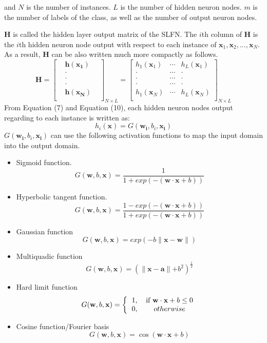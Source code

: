 \documentclass[a4paper, 14pt]{extarticle}
\begin{document}
and \(N\) is the number of instances. \(L\) is the number of hidden neuron nodes. \(m\) is the number of labels of the class, as well as the number of output neuron nodes.
\par \textbf{H} is called the hidden layer output matrix of the SLFN. The \(i\)th column of \textbf{H} is the \(i\)th hidden neuron node output with respect to each instance of \(\mathbf{x}_1, \mathbf{x}_2, ..., \mathbf{x}_N\)\cite{huang2006extreme}. As a result, \(\mathbf{H}\) can be also written much more compactly as follows. 
\begin{equation}
    \mathbf{H}
    =
    \begin{bmatrix}
    &\mathbf{h(x_1)}&\\
    &\cdot&\\
    &\cdot&\\
    &\cdot&\\
    &\mathbf{h(x_N)}&\\
    \end{bmatrix}_{N \times L}
    = 
    \begin{bmatrix}
    h_1(\mathbf{x}_1) & \cdots & h_L(\mathbf{x}_1)\\
    \cdot & \cdots & \cdot\\
    \cdot & \cdots & \cdot\\
    \cdot & \cdots & \cdot\\
    h_1(\mathbf{x}_N) & \cdots & h_L(\mathbf{x}_N)\\
    \end{bmatrix}_{N\times L}
\end{equation}
From Equation (7) and Equation (10), each hidden neuron nodes output regarding to each instance is written as:  
\begin{equation}
    h_i(\mathbf{x}) = G(\mathbf{w_i}, b_i, \mathbf{x_i})
\end{equation}
\(G(\mathbf{w_i}, b_i, \mathbf{x_i})\) can use the following activation functions to map the input domain into the output domain\cite{huang2015trends}.
\begin{itemize}
    \item Sigmoid function. \[G(\mathbf{w}, b, \mathbf{x})= \frac{1}{1+exp(-(\mathbf{w \cdot x}+b))}\]
    \item Hyperbolic tangent function. \[G(\mathbf{w}, b, \mathbf{x})= \frac{1-exp(-(\mathbf{w \cdot x}+b))}{1+exp(-(\mathbf{w \cdot x}+b))} \]
    \item Gaussian function \[G(\mathbf{w}, b, \mathbf{x})= exp(-b\parallel \mathbf{x}-\mathbf{w} \parallel)\]
    \item Multiquadic function \[G(\mathbf{w}, b, \mathbf{x})= (\parallel \mathbf{x} - \mathbf{a} \parallel+b^2)^{\frac{1}{2}}\]
    \item Hard limit function 
    \[G(\mathbf{w}, b, \mathbf{x})= 
     \bigg\{
    \begin{tabular}{cc}
     1, &if $\textbf{w} \cdot \textbf{x} + b \leq 0$\\
     0, &$otherwise$ 
     \end{tabular}
    \]
    \item Cosine function/Fourier basis \[G(\mathbf{w}, b, \mathbf{x})= \cos({\mathbf{w \cdot x}+b})\]
\end{itemize}
\end{document}
